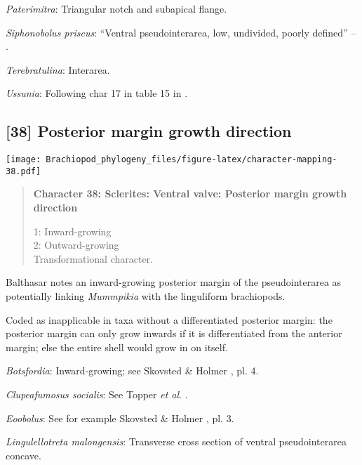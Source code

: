 \documentclass[openany]{book}
\theoremstyle{definition}
\theoremstyle{definition}
\theoremstyle{definition}
\theoremstyle{remark}
\begin{document}
\hypertarget{Paterimitra-coding-37}{}
\emph{Paterimitra}: Triangular notch and subapical flange.

\hypertarget{Siphonobolus_priscus-coding-37}{}
\emph{Siphonobolus priscus}: ``Ventral pseudointerarea, low, undivided,
poorly defined'' -- \citet{Williams2000LinguliformeaCraniiformea}.

\hypertarget{Terebratulina-coding-37}{}
\emph{Terebratulina}: Interarea.

\hypertarget{Ussunia-coding-37}{}
\emph{Ussunia}: Following char 17 in table 15 in
\citet{Williams2000LinguliformeaCraniiformea}.

\subsection*{{[}38{]} Posterior margin growth
direction}\label{posterior-margin-growth-direction}

\texttt{[image: Brachiopod\_phylogeny\_files/figure-latex/character-mapping-38.pdf]}

\begin{quote}
\textbf{Character 38: Sclerites: Ventral valve: Posterior margin growth
direction}

1: Inward-growing\\
2: Outward-growing\\
Transformational character.
\end{quote}

Balthasar \citeyearpar{Balthasar2008iMummpikia} notes an inward-growing
posterior margin of the pseudointerarea as potentially linking
\emph{Mummpikia} with the linguliform brachiopods.

Coded as inapplicable in taxa without a differentiated posterior margin:
the posterior margin can only grow inwards if it is differentiated from
the anterior margin; else the entire shell would grow in on itself.

\hypertarget{Botsfordia-coding-38}{}
\emph{Botsfordia}: Inward-growing; see Skovsted \& Holmer
\citeyearpar{Skovsted2005EarlyCambrian}, pl. 4.

\hypertarget{Clupeafumosus_socialis-coding-38}{}
\emph{Clupeafumosus socialis}: See Topper \emph{et al}.
\citeyearpar{Topper2013Reappraisalof}.

\hypertarget{Eoobolus-coding-38}{}
\emph{Eoobolus}: See for example Skovsted \& Holmer
\citeyearpar{Skovsted2005EarlyCambrian}, pl. 3.

\hypertarget{Lingulellotreta_malongensis-coding-38}{}
\emph{Lingulellotreta malongensis}: Transverse cross section of ventral
pseudointerarea concave.
\end{document}
